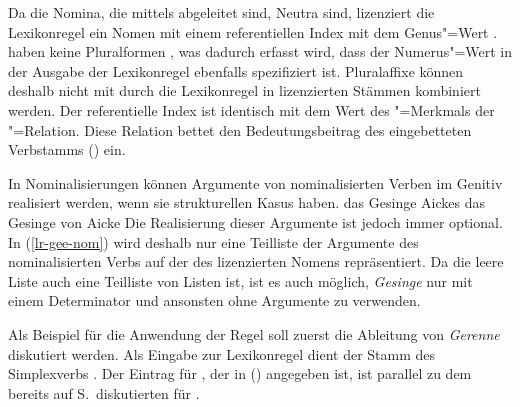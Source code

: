 \begin{comment}

The rule applies to all verbs. The valence properties of the nominalized verb
are ignored since this lexical rule licenses only the bare noun with a determiner
without any complements that could be inherited from the verb. Following 
\citet[Chapter~1]{ps2} and \citet{Demske2001a}, I assume that the noun selects a determiner,
\ie, I assume an NP analysis rather than a DP\is{determiner phrase}
analysis, but the rule in (\mex{0}) could be easily changed. For a DP
analysis in HPSG see \citew{Abb94}. A special variant of a DP analysis
can be found in \citew{Netter94} and \citew{Netter98-Eng}.
\end{comment}

Da die Nomina, die mittels \geen abgeleitet sind, Neutra sind, lizenziert
die Lexikonregel ein Nomen mit einem referentiellen Index mit dem Genus"=Wert .
\geenen haben keine Pluralformen \citep[]{Bierwisch89a}, was dadurch
erfasst wird, dass der Numerus"=Wert in der Ausgabe der Lexikonregel ebenfalls
spezifiziert ist. Pluralaffixe können deshalb nicht mit durch die Lexikonregel
in   lizenzierten Stämmen kombiniert werden. 
Der referentielle Index  ist identisch mit dem Wert des \argzero"=Merkmals
der "=Relation. Diese Relation bettet den Bedeutungsbeitrag des
eingebetteten Verbstamms (\ltop {}) ein.

In Nominalisierungen können Argumente von nominalisierten Verben im Genitiv realisiert werden, wenn
sie strukturellen Kasus haben.
\eal
\ex das Gesinge Aickes
\ex das Gesinge von Aicke
\zl
Die Realisierung dieser Argumente ist jedoch immer optional. In (\ref{lr-gee-nom}) wird deshalb nur
eine Teilliste der Argumente des nominalisierten Verbs auf der \argstl des lizenzierten Nomens
repräsentiert. Da die leere Liste auch eine Teilliste von Listen ist, ist es auch möglich,
\emph{Gesinge} nur mit einem Determinator und ansonsten ohne Argumente zu verwenden.


Als Beispiel für die Anwendung der Regel soll zuerst die Ableitung von \emph{Gerenne} diskutiert
werden. Als Eingabe zur Lexikonregel dient der Stamm des Simplexverbs .
Der Eintrag für , der in () angegeben ist, ist parallel
zu dem bereits auf S.\,\pageref{le-lachen} diskutierten für .

